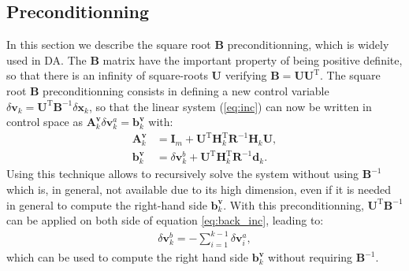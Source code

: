 \documentclass[npg, manuscript]{copernicus}
\begin{document}
\subsection{Preconditionning}
In this section we describe the square root $\mathbf{B}$ preconditionning, which is widely used in DA. 
The $\mathbf{B}$ matrix have the important property of being positive definite, so that there is an infinity of square-roots $\mathbf{U}$ verifying $\mathbf{B} = \mathbf{U} \mathbf{U}^\mathrm{T}$. The square root $\mathbf{B}$ preconditionning consists in defining a new control variable $\delta \mathbf{v}_k = \mathbf{U}^\mathrm{T} \mathbf{B}^{-1} \delta \mathbf{x}_k$, so that the linear system (\ref{eq:inc}) can now be written in control space as $\mathbf{A}^\mathbf{v}_k \delta \mathbf{v}^a_k = \mathbf{b}^\mathbf{v}_k$ with:
\begin{align}
\mathbf{A}^\mathbf{v}_k & = \mathbf{I}_m + \mathbf{U}^\mathrm{T} \mathbf{H}_k^\mathrm{T} \mathbf{R}^{-1} \mathbf{H}_k \mathbf{U},\\
\mathbf{b}^\mathbf{v}_k & = \delta \mathbf{v}^b_k + \mathbf{U}^\mathrm{T} \mathbf{H}_k^\mathrm{T} \mathbf{R}^{-1} \mathbf{d}_k.
\end{align}
Using this technique allows to recursively solve the system without using $\mathbf{B}^{-1}$ which is, in general, not available due to its high dimension, even if it is needed in general to compute the right-hand side $\mathbf{b}^\mathbf{v}_k$. With this preconditionning, $\mathbf{U}^\mathrm{T} \mathbf{B}^{-1}$ can be applied on both side of equation \eqref{eq:back_inc}, leading to:
\begin{align}
\label{eq:back_inc_U}
\delta \mathbf{v}^b_k = - \sum_{i=1}^{k-1} \delta \mathbf{v}^a_i,
\end{align}
which can be used to compute the right hand side $\mathbf{b}^\mathbf{v}_k$ without requiring $\mathbf{B}^{-1}$.
\end{document}
